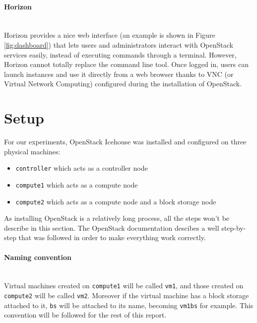 \paragraph{Horizon}\mbox{}\\
Horizon provides a nice web interface (an example is shown in Figure \ref{fig:dashboard}) that lets users and administrators interact with OpenStack services easily, instead of executing commands through a terminal. 
However, Horizon cannot totally replace the command line tool.
Once logged in, users can launch instances and use it directly from a web browser thanks to VNC (or Virtual Network Computing) configured during the installation of OpenStack.








\section{Setup}
\label{section_setup}
For our experiments, OpenStack Icehouse was installed and configured on three physical machines:

{
\singlespacing
\begin{itemize}
	\item{\texttt{controller} which acts as a controller node}
	\item{\texttt{compute1} which acts as a compute node}
	\item{\texttt{compute2} which acts as a compute node and a block storage node}
\end{itemize}
}

As installing OpenStack is a relatively long process, all the steps won't be describe in this section. The OpenStack documentation \cite{osinstall}
descibes a well step-by-step that was followed in order to make everything work correctly.


\paragraph{Naming convention}\mbox{}\\
Virtual machines created on \texttt{compute1} will be called \texttt{vm1}, and those created on \texttt{compute2} will be called \texttt{vm2}. Moreover if the virtual machine has a block storage attached to it, \texttt{bs} will be attached to its name, becoming \texttt{vm1bs} for example. This convention will be followed for the rest of this report.


